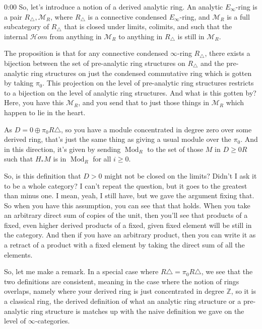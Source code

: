 \begin{unfinished}{0:00}
So, let's introduce a notion of a derived analytic ring. An analytic $E_\infty$-ring is a pair $R_\triangle, \mathcal{M}_R$, where $R_\triangle$ is a connective condensed $E_\infty$-ring, and $\mathcal{M}_R$ is a full subcategory of $R_\triangle$ that is closed under limits, colimits, and such that the internal $\mathcal{H}om$ from anything in $\mathcal{M}_R$ to anything in $R_\triangle$ is still in $\mathcal{M}_R$.

The proposition is that for any connective condensed $\infty$-ring $R_\triangle$, there exists a bijection between the set of pre-analytic ring structures on $R_\triangle$ and the pre-analytic ring structures on just the condensed commutative ring which is gotten by taking $\pi_0$. This projection on the level of pre-analytic ring structures restricts to a bijection on the level of analytic ring structures. And what is this gotten by? Here, you have this $\mathcal{M}_R$, and you send that to just those things in $\mathcal{M}_R$ which happen to lie in the heart.

As $D = 0 \oplus \pi_0 R \triangle$, so you have a module concentrated in degree zero over some derived ring, that's just the same thing as giving a usual module over the $\pi_0$. And in this direction, it's given by sending $\operatorname{Mod}_R$ to the set of those $M$ in $D \geq 0 R$ such that $H_* M$ is in $\operatorname{Mod}_R$ for all $i \geq 0$. 

So, is this definition that $D > 0$ might not be closed on the limits? Didn't I ask it to be a whole category? I can't repeat the question, but it goes to the greatest than minus one. I mean, yeah, I still have, but we gave the argument fixing that. So when you have this assumption, you can see that that holds. When you take an arbitrary direct sum of copies of the unit, then you'll see that products of a fixed, even higher derived products of a fixed, given fixed element will be still in the category. And then if you have an arbitrary product, then you can write it as a retract of a product with a fixed element by taking the direct sum of all the elements.

So, let me make a remark. In a special case where $R \triangle = \pi_0 R \triangle$, we see that the two definitions are consistent, meaning in the case where the notion of rings overlaps, namely where your derived ring is just concentrated in degree $\mathbb{Z}$, so it is a classical ring, the derived definition of what an analytic ring structure or a pre-analytic ring structure is matches up with the naive definition we gave on the level of $\infty$-categories.


\end{unfinished}
